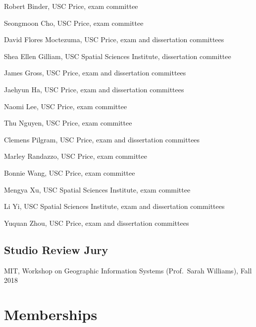 \documentclass[11pt,letterpaper]{report}
\newcommand{\listitemspace}{0.25em}
\renewenvironment{itemize}
{\begin{list}{}{\setlength{\leftmargin}{0em}
                \setlength{\parskip}{0em}
                \setlength{\itemsep}{\listitemspace}
                \setlength{\parsep}{\listitemspace}}}
{\end{list}}
\begin{document}
    \begin{itemize}

        \item Robert Binder, USC Price, exam committee
        \item Seongmoon Cho, USC Price, exam committee
        \item David Flores Moctezuma, USC Price, exam and dissertation committees
        \item Shea Ellen Gilliam, USC Spatial Sciences Institute, dissertation committee
        \item James Gross, USC Price, exam and dissertation committees
        \item Jaehyun Ha, USC Price, exam and dissertation committees
        \item Naomi Lee, USC Price, exam committee
        \item Thu Nguyen, USC Price, exam committee
        \item Clemens Pilgram, USC Price, exam and dissertation committees
        \item Marley Randazzo, USC Price, exam committee
        \item Bonnie Wang, USC Price, exam committee
        \item Mengya Xu, USC Spatial Sciences Institute, exam committee
        \item Li Yi, USC Spatial Sciences Institute, exam and dissertation committees
        \item Yuquan Zhou, USC Price, exam and dissertation committees

    \end{itemize}

    \subsection*{Studio Review Jury}

    \begin{itemize}

        \item MIT, Workshop on Geographic Information Systems (Prof.\ Sarah Williams), Fall 2018

    \end{itemize}



    \section*{Memberships}
\end{document}
